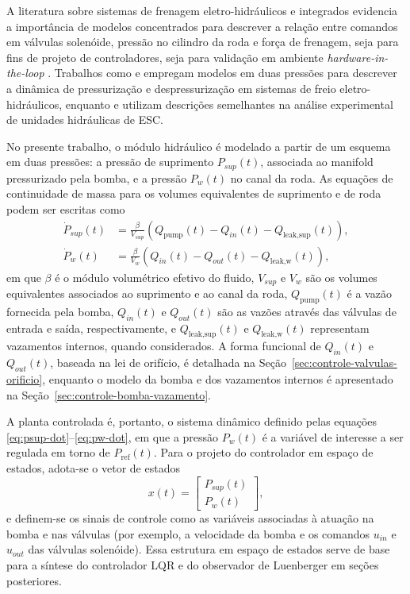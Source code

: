 A literatura sobre sistemas de frenagem eletro-hidráulicos e integrados evidencia a importância de modelos concentrados para descrever a relação entre comandos em válvulas solenóide, pressão no cilindro da roda e força de frenagem, seja para fins de projeto de controladores, seja para validação em ambiente \emph{hardware-in-the-loop} \cite{HouhuaJing2022,PressureCoordinatedControl2023,ZengYangHuang2023,MotorParametricDesign2023}. Trabalhos como  e  empregam modelos em duas pressões para descrever a dinâmica de pressurização e despressurização em sistemas de freio eletro-hidráulicos, enquanto  e  utilizam descrições semelhantes na análise experimental de unidades hidráulicas de ESC.

No presente trabalho, o módulo hidráulico é modelado a partir de um esquema em duas pressões: a pressão de suprimento $P_{sup}(t)$, associada ao manifold pressurizado pela bomba, e a pressão $P_w(t)$ no canal da roda. As equações de continuidade de massa para os volumes equivalentes de suprimento e de roda podem ser escritas como
\begin{align}
    \dot{P}_{sup}(t) &= \frac{\beta}{V_{sup}}\left(Q_{\text{pump}}(t) - Q_{in}(t) - Q_{\text{leak,sup}}(t)\right),
    \label{eq:psup-dot}\\[4pt]
    \dot{P}_{w}(t) &= \frac{\beta}{V_{w}}\left(Q_{in}(t) - Q_{out}(t) - Q_{\text{leak,w}}(t)\right),
    \label{eq:pw-dot}
\end{align}
em que $\beta$ é o módulo volumétrico efetivo do fluido, $V_{sup}$ e $V_{w}$ são os volumes equivalentes associados ao suprimento e ao canal da roda, $Q_{\text{pump}}(t)$ é a vazão fornecida pela bomba, $Q_{in}(t)$ e $Q_{out}(t)$ são as vazões através das válvulas de entrada e saída, respectivamente, e $Q_{\text{leak,sup}}(t)$ e $Q_{\text{leak,w}}(t)$ representam vazamentos internos, quando considerados. A forma funcional de $Q_{in}(t)$ e $Q_{out}(t)$, baseada na lei de orifício, é detalhada na Seção~\ref{sec:controle-valvulas-orificio}, enquanto o modelo da bomba e dos vazamentos internos é apresentado na Seção~\ref{sec:controle-bomba-vazamento}.

A planta controlada é, portanto, o sistema dinâmico definido pelas equações \eqref{eq:psup-dot}–\eqref{eq:pw-dot}, em que a pressão $P_w(t)$ é a variável de interesse a ser regulada em torno de $P_{\mathrm{ref}}(t)$. Para o projeto do controlador em espaço de estados, adota-se o vetor de estados
\begin{equation}
    x(t) = 
    \begin{bmatrix}
        P_{sup}(t) \\
        P_{w}(t)
    \end{bmatrix},
    \label{eq:vect-estados-hidraulico}
\end{equation}
e definem-se os sinais de controle como as variáveis associadas à atuação na bomba e nas válvulas (por exemplo, a velocidade da bomba e os comandos $u_{in}$ e $u_{out}$ das válvulas solenóide). Essa estrutura em espaço de estados serve de base para a síntese do controlador LQR e do observador de Luenberger em seções posteriores.

